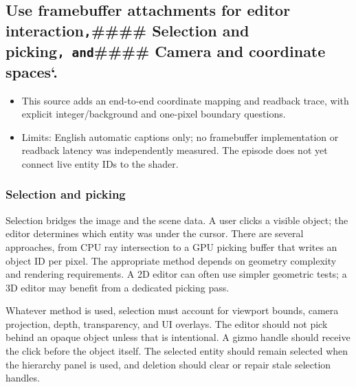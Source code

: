 \subsection{\texorpdfstring{Use framebuffer attachments for editor interaction\texttt{,}\#\#\#\# Selection and picking\texttt{,\ and}\#\#\#\# Camera and coordinate spaces`.}{Use framebuffer attachments for editor interaction,\#\#\#\# Selection and picking, and\#\#\#\# Camera and coordinate spaces`.}}\label{06-engine-ii-ch032-use-framebuffer-attachments-for-editor-interaction-selection-and-picking-and-camera-and-coordinate-spaces.}

\hypertarget{06-engine-ii-ch032-use-framebuffer-attachments-for-editor-interaction-selection-and-picking-and-camera-and-coordinate-spaces.}{}

\begin{itemize}
\tightlist
\item
  This source adds an end-to-end coordinate mapping and readback trace, with explicit integer/background and one-pixel boundary questions.
\item
  Limits: English automatic captions only; no framebuffer implementation or readback latency was independently measured. The episode does not yet connect live entity IDs to the shader.
\end{itemize}

\subsubsection{Selection and picking}\label{06-engine-ii-ch032-selection-and-picking}

\hypertarget{06-engine-ii-ch032-selection-and-picking}{}

Selection bridges the image and the scene data. A user clicks a visible object; the editor determines which entity was under the cursor. There are several approaches, from CPU ray intersection to a GPU picking buffer that writes an object ID per pixel. The appropriate method depends on geometry complexity and rendering requirements. A 2D editor can often use simpler geometric tests; a 3D editor may benefit from a dedicated picking pass.

Whatever method is used, selection must account for viewport bounds, camera projection, depth, transparency, and UI overlays. The editor should not pick behind an opaque object unless that is intentional. A gizmo handle should receive the click before the object itself. The selected entity should remain selected when the hierarchy panel is used, and deletion should clear or repair stale selection handles.


